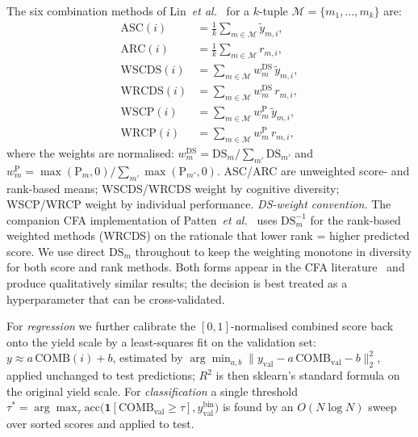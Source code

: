 \documentclass[conference]{IEEEtran}
\begin{document}
\medskip
The six combination methods of Lin~\textit{et al.}~\cite{Lin2007} for a
$k$-tuple $\mathcal{M}\!=\!\{m_1,\ldots,m_k\}$ are:
\begin{align}
\mathrm{ASC}(i)   &= \tfrac{1}{k}\textstyle\sum_{m\in\mathcal{M}} \tilde y_{m,i}, \label{eq:asc}\\
\mathrm{ARC}(i)   &= \tfrac{1}{k}\textstyle\sum_{m\in\mathcal{M}} r_{m,i},      \label{eq:arc}\\
\mathrm{WSCDS}(i) &= \textstyle\sum_{m\in\mathcal{M}} w^{\text{DS}}_{m}\,\tilde y_{m,i}, \label{eq:wscds}\\
\mathrm{WRCDS}(i) &= \textstyle\sum_{m\in\mathcal{M}} w^{\text{DS}}_{m}\,r_{m,i},        \label{eq:wrcds}\\
\mathrm{WSCP}(i)  &= \textstyle\sum_{m\in\mathcal{M}} w^{\text{P}}_{m}\,\tilde y_{m,i},  \label{eq:wscp}\\
\mathrm{WRCP}(i)  &= \textstyle\sum_{m\in\mathcal{M}} w^{\text{P}}_{m}\,r_{m,i},         \label{eq:wrcp}
\end{align}
where the weights are normalised:
$w^{\text{DS}}_{m}\!=\!\mathrm{DS}_m\!/\!\sum_{m'}\!\mathrm{DS}_{m'}$ and
$w^{\text{P}}_{m}\!=\!\max(\mathrm{P}_m,0)\!/\!\sum_{m'}\!\max(\mathrm{P}_{m'},0)$.
\textsc{ASC}/\textsc{ARC} are unweighted score- and rank-based means;
\textsc{WSCDS}/\textsc{WRCDS} weight by cognitive diversity;
\textsc{WSCP}/\textsc{WRCP} weight by individual performance.
\textit{DS-weight convention.} The companion CFA implementation of
Patten~\textit{et al.}~\cite{Patten2026Quantum} uses
$\mathrm{DS}_m^{-1}$ for the rank-based weighted methods (\textsc{WRCDS})
on the rationale that lower rank = higher predicted score. We use
direct $\mathrm{DS}_m$ throughout to keep the weighting monotone in
diversity for both score and rank methods. Both forms appear in the CFA
literature~\cite{Hurley2021} and produce
qualitatively similar results; the decision is best treated as a
hyperparameter that can be cross-validated.

\medskip
For \emph{regression} we further calibrate the $[0,1]$-normalised combined
score back onto the yield scale by a least-squares fit on the validation
set:
$y \approx a\,\mathrm{COMB}(i) + b$,
estimated by $\arg\min_{a,b} \|y_{\text{val}} - a\,\mathrm{COMB}_{\text{val}}-b\|_2^2$,
applied unchanged to test predictions; $R^{2}$ is then sklearn's standard
formula on the original yield scale.
For \emph{classification} a single threshold
$\tau^{*}\!=\!\arg\max_{\tau} \mathrm{acc}\bigl(\mathbf{1}[\mathrm{COMB}_{\text{val}}\!\geq\!\tau], y^{\text{bin}}_{\text{val}}\bigr)$
is found by an $O(N\log N)$ sweep over sorted scores and applied to test.
\end{document}
